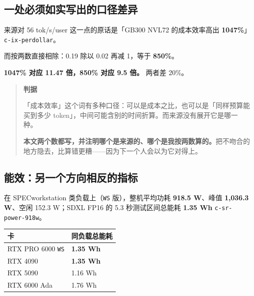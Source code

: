 \subsection{一处必须如实写出的口径差异}

来源对 56 tok/s/user 这一点的原话是「GB300 NVL72 的成本效率高出 \textbf{1047\%}」{\scriptsize\texttt{c-\hspace{0pt}ix-\hspace{0pt}perdollar}}。


而按两数直接相除：0.19 除以 0.02 再减 1，等于 \textbf{850\%}。


\textbf{1047\% 对应 11.47 倍，850\% 对应 9.5 倍。} 两者差 20\%。


\begin{quote}\small
\textbf{ 判据}

「成本效率」这个词有多种口径：可以是成本之比，也可以是「同样预算能买到多少 token」，中间可能含别的时间折算。而来源没有展开它是哪一种。

\textbf{本文两个数都写，并注明哪个是来源的、哪个是我按两数算的。}把不吻合的地方隐去，比算错更糟——因为下一个人会以为它对得上。

\end{quote}

\subsection{能效：另一个方向相反的指标}

在 SPECworkstation 类负载上（\texttt{WS} 版），整机平均功耗 \textbf{918.5 W}、峰值 \textbf{1,036.3 W}、空闲 152.3 W；SDXL FP16 的 5.3 秒测试区间总能耗 \textbf{1.35 Wh} {\scriptsize\texttt{c-\hspace{0pt}sr-\hspace{0pt}power-\hspace{0pt}918w}}。


\begin{table}[t]
\centering
\footnotesize
\setlength{\tabcolsep}{4pt}
\label{tab:23}
\begin{tabular}{ll}
\toprule
卡 & 同负载总能耗 \\
\midrule
RTX PRO 6000 \texttt{WS} & \textbf{1.35 Wh} \\
RTX 4090 & \textbf{1.35 Wh} \\
RTX 5090 & 1.16 Wh \\
RTX 6000 Ada & 1.76 Wh \\
\bottomrule
\end{tabular}
\end{table}

